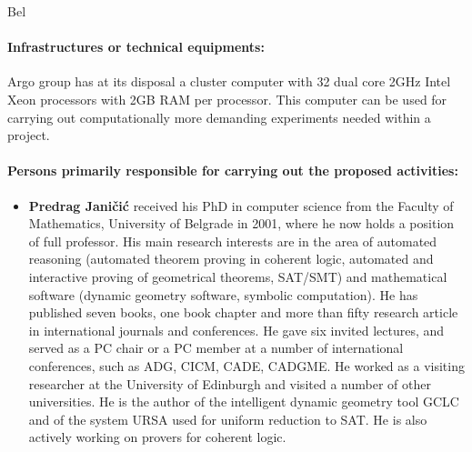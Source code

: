\begin{sitedescription}{Bel}
  \paragraph{Infrastructures or technical equipments:}
  

  Argo group has at its disposal a cluster computer with 32 dual core
  2GHz Intel Xeon processors with 2GB RAM per processor. This computer
  can be used for carrying out computationally more demanding
  experiments needed within a project.

  \paragraph{Persons primarily responsible for carrying out the proposed activities:}
  
  \begin{itemize} %
    
  \item{\bf Predrag Janičić} received his PhD in computer science from
    the Faculty of Mathematics, University of Belgrade in 2001, where
    he now holds a position of full professor. His main research
    interests are in the area of automated reasoning (automated
    theorem proving in coherent logic, automated and interactive
    proving of geometrical theorems, SAT/SMT) and mathematical
    software (dynamic geometry software, symbolic computation). He has
    published seven books, one book chapter and more than fifty
    research article in international journals and conferences. He
    gave six invited lectures, and served as a PC chair or a PC member
    at a number of international conferences, such as ADG, CICM, CADE,
    CADGME. He worked as a visiting researcher at the University of
    Edinburgh and visited a number of other universities. He is the
    author of the intelligent dynamic geometry tool GCLC and of the
    system URSA used for uniform reduction to SAT. He is also actively
    working on provers for coherent logic.


\end{itemize}
\end{sitedescription}
